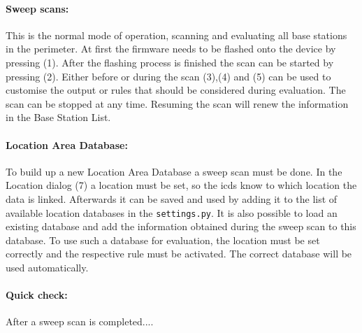 \paragraph{Sweep scans:} This is the normal mode of operation, scanning and evaluating all base stations in the perimeter.
At first the firmware needs to be flashed onto the device by pressing (1).
After the flashing process is finished the scan can be started by pressing (2).
Either before or during the scan (3),(4) and (5) can be used to customise the output or rules that should be considered during evaluation.
The scan can be stopped at any time.
Resuming the scan will renew the information in the Base Station List.

\paragraph{Location Area Database:} To build up a new Location Area Database a sweep scan must be done.
In the Location dialog (7) a location must be set, so the \gls{icds} know to which location the data is linked.
Afterwards it can be saved and used by adding it to the list of available location databases in the \texttt{settings.py}.
It is also possible to load an existing database and add the information obtained during the sweep scan to this database.
To use such a database for evaluation, the location must be set correctly and the respective rule must be activated.
The correct database will be used automatically.

\paragraph{Quick check:} After a sweep scan is completed....
